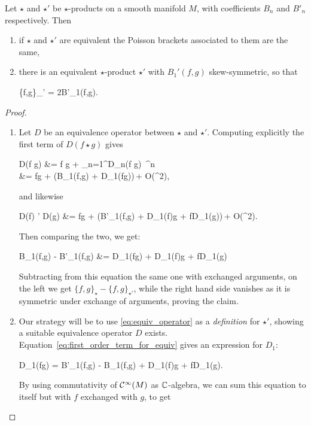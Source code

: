 \begin{lemma}
	Let $\star$ and $\star'$ be $\star$-products on a smooth manifold $M$, with coefficients $B_n$ and $B'_n$ respectively. Then
	\begin{enumerate}
		\item if $\star$ and $\star'$ are equivalent the Poisson brackets associated to them are the same,
		\item there is an equivalent $\star$-product $\star'$ with $B_1'(f,g)$ skew-symmetric, so that
		\begin{eqalign}
			\{f,g\}_{\star'} = 2B'_1(f,g).
		\end{eqalign}
	\end{enumerate}
\end{lemma}
\begin{proof}
	\leavevmode
	\begin{enumerate}
		\item Let $D$ be an equivalence operator between $\star$ and $\star'$. Computing explicitly the first term of $D(f \star g)$ gives
		\begin{eqalign}
			D(f \star g) &= f \star g + \sum_{n=1}^\infty D_n(f \star g)\, \planck^n\\
			&= fg + (B_1(f,g) + D_1(fg))\,\planck + O(\planck^2),
		\end{eqalign}
		and likewise
		\begin{eqalign}
			D(f) \star' D(g) &= fg + (B'_1(f,g) + D_1(f)g + fD_1(g))\,\planck + O(\planck^2).
		\end{eqalign}
		Then comparing the two, we get:
		\begin{eqalign}
		\label{eq:first_order_term_for_equiv}
			B_1(f,g) - B'_1(f,g) &= D_1(fg) + D_1(f)g + fD_1(g)
		\end{eqalign}
		Subtracting from this equation the same one with exchanged arguments, on the left we get $\{f,g\}_\star - \{f,g\}_{\star'}$, while the right hand side vanishes as it is symmetric under exchange of arguments, proving the claim.
		\item Our strategy will be to use \eqref{eq:equiv_operator} as a \emph{definition} for $\star'$, showing a suitable equivalence operator $D$ exists. Equation~\eqref{eq:first_order_term_for_equiv} gives an expression for $D_1$:
		\begin{eqalign}
			D_1(fg) = B'_1(f,g) - B_1(f,g) + D_1(f)g + fD_1(g).
		\end{eqalign}
		By using commutativity of $\mathcal{C}^\infty(M)$ as $\mathbb{C}$-algebra, we can sum this equation to itself but with $f$ exchanged with $g$, to get

\end{enumerate}
\end{proof}
